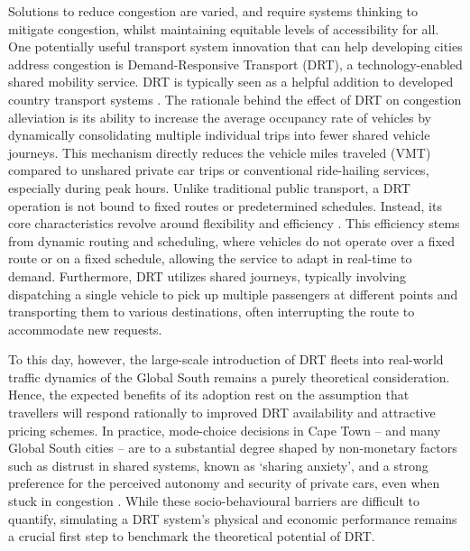 \documentclass[preprint,12pt,authoryear]{elsarticle}
\newif\ifshowtodooverview
\DeclareRobustCommand{\todobacklink}{%
  \ifshowtodooverview\quad{\scriptsize\hyperlink{todo-overview}{[\,$\uparrow$ Overview\,]}}\fi
}
\newcommand{\leif}[1]{\todo[inline, color=yellow!40]{\textbf{Leif:} #1\todobacklink}}
\newcommand{\alex}[1]{\todo[inline, color=blue!40]{\textbf{Alex:} #1\todobacklink}}
\newcommand{\absatz}{\par\hspace*{1.5em}\ignorespaces}
\begin{document}
\absatz
Solutions to reduce congestion are varied, and require systems thinking to mitigate congestion, whilst maintaining equitable levels of accessibility for all.
One potentially useful transport system innovation that can help developing cities address congestion is Demand-Responsive Transport (DRT), a technology-enabled shared mobility service.
DRT is typically seen as a helpful addition to developed country transport systems \citep{Ben-dor, engelhardt2019quantifying, schluter2021impact, Kaddoura.2020,maggi2021price, miskolczi2021urban, zwick2021ride, article}.
The rationale behind the effect of DRT on congestion alleviation is its ability to increase the average occupancy rate of vehicles by dynamically consolidating multiple individual trips into fewer shared vehicle journeys.
This mechanism directly reduces the vehicle miles traveled (VMT) compared to unshared private car trips or conventional ride-hailing services, especially during peak hours.
Unlike traditional public transport, a DRT operation is not bound to fixed routes or predetermined schedules.\hypertarget{todo:intro-drt-setup}{}\leif{It depends on the service setup.}\hypertarget{todo:intro-drt-setup-alex}{}\alex{Discuss with Leif}
Instead, its core characteristics revolve around flexibility and efficiency \citep{ronald2015simulating}.
This efficiency stems from dynamic routing and scheduling, where vehicles do not operate over a fixed route or on a fixed schedule, allowing the service to adapt in real-time to demand.
Furthermore, DRT utilizes shared journeys, typically involving dispatching a single vehicle to pick up multiple passengers at different points and transporting them to various destinations, often interrupting the route to accommodate new requests.
\absatz
To this day, however, the large-scale introduction of DRT fleets into real-world traffic dynamics of the Global South remains a purely theoretical consideration.
Hence, the expected benefits of its adoption rest on the assumption that travellers will respond rationally to improved DRT availability and attractive pricing schemes.
In practice, mode-choice decisions in Cape Town – and many Global South cities – are to a substantial degree shaped by non-monetary factors such as distrust in shared systems, known as ‘sharing anxiety’, and a strong preference for the perceived autonomy and security of private cars, even when stuck in congestion \citep{Dolins2021, Lavieri.2019}.
While these socio-behavioural barriers are difficult to quantify, simulating a DRT system’s physical and economic performance remains a crucial first step to benchmark the theoretical potential of DRT.
\end{document}
